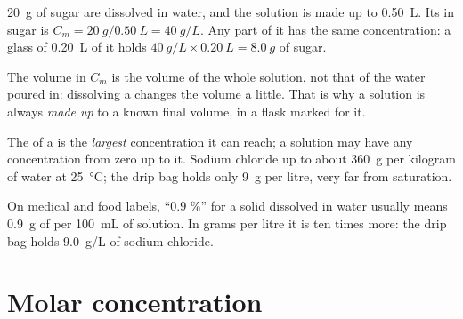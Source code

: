 \begin{example}\label{ex:g10:concentration-and-dilution:sugar}
\qty{20}{g} of sugar are dissolved in water, and the solution is made up
to \qty{0.50}{L}. Its  in sugar is
$C_m = \qty{20}{g} / \qty{0.50}{L} = \qty{40}{g/L}$. Any part of it has
the same concentration: a glass of \qty{0.20}{L} of it holds
$\qty{40}{g/L} \times \qty{0.20}{L} = \qty{8.0}{g}$ of sugar.
\end{example}


\begin{remark}\label{rem:g10:concentration-and-dilution:volume}
The volume in $C_m$ is the volume of the whole solution, not that of the
water poured in: dissolving a  changes the volume a little. That
is why a solution is always \emph{made up} to a known final volume, in
a flask marked for it.
\end{remark}

\begin{remark}\label{rem:g10:concentration-and-dilution:not-solubility}
The  of a  is the \emph{largest} concentration it can
reach; a solution may have any concentration from zero up to it. Sodium
chloride  up to about \qty{360}{g} per kilogram of water at
\qty{25}{\celsius}; the drip bag holds only \qty{9}{g} per litre, very
far from saturation.
\end{remark}

\begin{remark}\label{rem:g10:concentration-and-dilution:percent}
On medical and food labels, ``0.9 \%'' for a solid dissolved in water
usually means \qty{0.9}{g} of  per \qty{100}{mL} of solution. In
grams per litre it is ten times more: the drip bag holds \qty{9.0}{g/L}
of sodium chloride.
\end{remark}

\section{Molar concentration}

